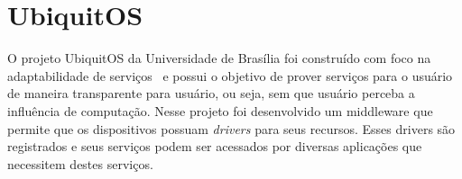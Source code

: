 \section{UbiquitOS}

O projeto UbiquitOS da Universidade de Brasília foi construído com foco na adaptabilidade de serviços~\cite{gomes2007} e possui o objetivo de prover serviços para o usuário de maneira transparente para usuário, ou seja, sem que usuário perceba a influência de computação. Nesse projeto foi desenvolvido um middleware que permite que os dispositivos possuam \emph{drivers} para seus recursos. Esses drivers são registrados e seus serviços podem ser acessados por diversas aplicações que necessitem destes serviços.


